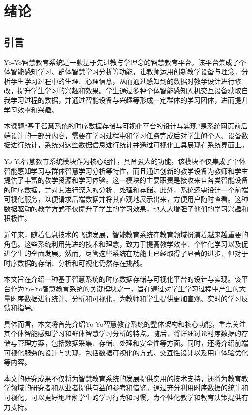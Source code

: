 \documentclass[oneside]{xduugthesis}
\begin{document}
\chapter{绪论}

\section{引言}

Yo-Yo智慧教育系统是一款基于先进教与学理念的智慧教育平台。该平台集成了个体智能感知学习、群体智慧学习分析等功能，让教师运用创新教学设备与理念，分析学生学习过程中的生理、心理信息，从而通过感知到的数据对教学设计进行修改，提升学生学习的兴趣和效果。学生通过多种个体智能感知人机交互设备获取自我学习过程的数据，并通过智能设备与兴趣等形成一定群体的学习团体，进而提升学习效率和兴趣。

本课题“基于智慧系统的时序数据存储与可视化平台的设计与实现”是系统网页前后端设计的一部分内容，需要在学习过程中和学习任务完成后对学生的个人、设备数据进行统计，系统对这些数据信息进行统计并通过可视化工具展现在系统界面上。

Yo-Yo智慧教育系统模块作为核心组件，具备强大的功能。该模块不仅集成了个体智能感知学习与群体智慧学习分析等特性，而且通过创新的教学设备为教师和学生提供了丰富的教学资源和学习体验。这一模块的主要职责是接收来自各类智能设备的时序数据，并对其进行深入的分析、处理和存储。此外，系统还需设计一个前端可视化服务，以便请求后端数据并将其直观地展示出来，方便用户随时查看。这种数据驱动的教学方式不仅提升了学生的学习效果，也大大增强了他们的学习兴趣和积极性。

近年来，随着信息技术的飞速发展，智能教育系统在教育领域扮演着越来越重要的角色。这些系统利用先进的技术和理念，致力于提高教学效率、个性化学习以及促进学生的全面发展。然而，尽管这些系统在功能上已经取得了显著的进步，但对于时序数据的存储、分析和可视化仍然存在挑战\cite{郑娅峰2021教育大数据可视化研究综述}。

本文旨在介绍一种基于智慧系统的时序数据存储与可视化平台的设计与实现。该平台作为Yo-Yo智慧教育系统的关键模块之一，旨在通过对学生学习过程中产生的大量时序数据进行统计、分析和可视化，为教师和学生提供更加直观、实时的学习反馈和指导。

具体而言，本文将首先介绍Yo-Yo智慧教育系统的整体架构和核心功能，重点关注其个体智能感知学习和群体智慧学习分析的特点。随后，将详细讨论时序数据的存储与管理方案，包括数据采集、存储、处理和安全性等方面。同时，还将介绍前端可视化服务的设计与实现，包括数据可视化的方式、交互性设计以及用户体验优化等内容。

本文的研究成果不仅将为智慧教育系统的发展提供实用的技术支持，还将为教育教学领域的研究者和从业者提供有益的参考和借鉴。通过充分利用时序数据的统计和可视化，可以更好地理解学生的学习行为和习惯，为个性化教学和教育决策提供有力支持。
\end{document}
